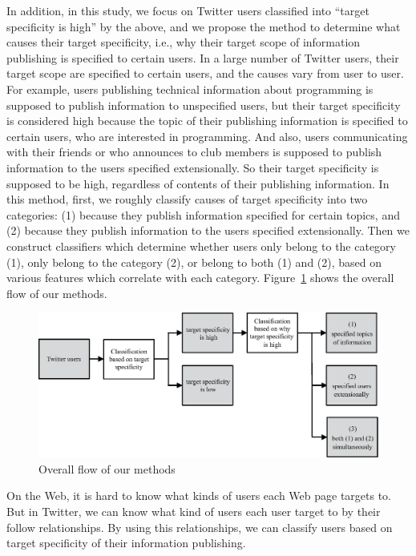 In addition, in this study, we focus on Twitter users classified into
``target specificity is high'' by the above, and we propose the
method to determine what causes their target specificity, i.e., why
their target scope of information publishing is specified to certain
users.  In a large number of Twitter users, their target scope are
specified to certain users, and the causes vary from user to user.  For
example, users publishing technical information about programming is supposed to
publish information to unspecified users, but their target specificity
is considered high because the topic of their publishing information
is specified to certain users, who are
interested in programming.  And also, users communicating with
their friends or who announces to club members is supposed to publish
information to the users specified
extensionally. So their target specificity is supposed to be high,
regardless of contents of their publishing information.  In this method,
first, we roughly classify causes of target specificity into two
categories: (1) because they publish information specified for certain
topics, and (2) because they publish information to the users specified
extensionally. Then we construct classifiers which determine
whether users only belong to the category (1), only belong to the category (2),
or belong to both (1) and (2), based on various features which correlate
with each category.  Figure~\ref{fig:Flow} shows the overall flow of our
methods.

{\footnotesize
\begin{figure}[t]
\begin{center}
\includegraphics[width=14cm]{images/flow.eps}
 \caption{Overall flow of our methods}
\label{fig:Flow}
\end{center}
\end{figure}
}

On the Web, it is hard to know what kinds of users each Web page targets
to.  But in Twitter, we can know what kind of users each user target to
by their follow relationships.  By using this relationships, we can
classify users based on target specificity of their information
publishing.

